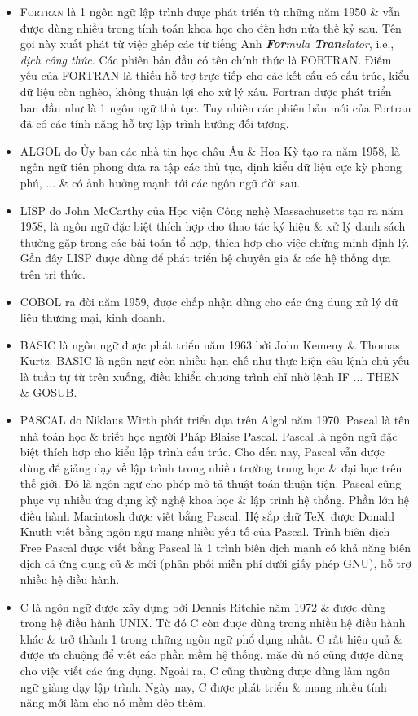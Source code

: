 \documentclass[oneside]{book}
\numberwithin{equation}{section}
\begin{document}
\begin{itemize}
	\item \textsc{Fortran} là 1 ngôn ngữ lập trình được phát triển từ những năm 1950 \& vẫn được dùng nhiều trong tính toán khoa học cho đến hơn nửa thế kỷ sau. Tên gọi này xuất phát từ việc ghép các từ tiếng Anh \textit{\textbf{For}mula \textbf{Tran}slator}, i.e., \textit{dịch công thức}. Các phiên bản đầu có tên chính thức là FORTRAN. Điểm yếu của FORTRAN là thiếu hỗ trợ trực tiếp cho các kết cấu có cấu trúc, kiểu dữ liệu còn nghèo, không thuận lợi cho xử lý xâu. Fortran được phát triển ban đầu như là 1 ngôn ngữ thủ tục. Tuy nhiên các phiên bản mới của Fortran đã có các tính năng hỗ trợ lập trình hướng đối tượng.
	\item ALGOL do Ủy ban các nhà tin học châu Âu \& Hoa Kỳ tạo ra năm 1958, là ngôn ngữ tiên phong đưa ra tập các thủ tục, định kiểu dữ liệu cực kỳ phong phú, $\ldots$ \& có ảnh hưởng mạnh tới các ngôn ngữ đời sau.
	\item LISP do John McCarthy của Học viện Công nghệ Massachusetts tạo ra năm 1958, là ngôn ngữ đặc biệt thích hợp cho thao tác ký hiệu \& xử lý danh sách thường gặp trong các bài toán tổ hợp, thích hợp cho việc chứng minh định lý. Gần đây LISP được dùng để phát triển hệ chuyên gia \& các hệ thống dựa trên tri thức.
	\item COBOL ra đời năm 1959, được chấp nhận dùng cho các ứng dụng xử lý dữ liệu thương mại, kinh doanh.
	\item BASIC là ngôn ngữ được phát triển năm 1963 bởi John Kemeny \& Thomas Kurtz. BASIC là ngôn ngữ còn nhiều hạn chế như thực hiện câu lệnh chủ yếu là tuần tự từ trên xuống, điều khiển chương trình chỉ nhờ lệnh IF $\ldots$ THEN \& GOSUB.
	\item PASCAL do Niklaus Wirth phát triển dựa trên Algol năm 1970. Pascal là tên nhà toán học \& triết học người Pháp Blaise Pascal. Pascal là ngôn ngữ đặc biệt thích hợp cho kiểu lập trình cấu trúc. Cho đến nay, Pascal vẫn được dùng để giảng dạy về lập trình trong nhiều trường trung học \& đại học trên thế giới. Đó là ngôn ngữ cho phép mô tả thuật toán thuận tiện. Pascal cũng phục vụ nhiều ứng dụng kỹ nghệ khoa học \& lập trình hệ thống. Phần lớn hệ điều hành Macintosh được viết bằng Pascal. Hệ sắp chữ \TeX\ được Donald Knuth viết bằng ngôn ngữ mang nhiều yếu tố của Pascal. Trình biên dịch Free Pascal được viết bằng Pascal là 1 trình biên dịch mạnh có khả năng biên dịch cả ứng dụng cũ \& mới (phân phối miễn phí dưới giấy phép GNU), hỗ trợ nhiều hệ điều hành.
	\item C là ngôn ngữ được xây dựng bởi Dennis Ritchie năm 1972 \& được dùng trong hệ điều hành UNIX. Từ đó C còn được dùng trong nhiều hệ điều hành khác \& trở thành 1 trong những ngôn ngữ phổ dụng nhất. C rất hiệu quả \& được ưa chuộng để viết các phần mềm hệ thống, mặc dù nó cũng được dùng cho việc viết các ứng dụng. Ngoài ra, C cũng thường được dùng làm ngôn ngữ giảng dạy lập trình. Ngày nay, C được phát triển \& mang nhiều tính năng mới làm cho nó mềm dẻo thêm.

\end{itemize}
\end{document}

